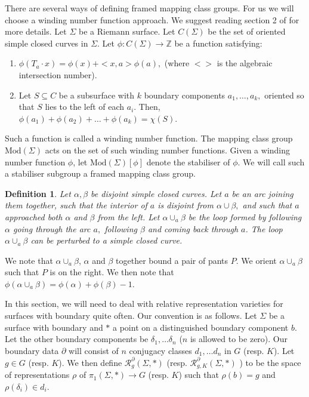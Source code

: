 \documentclass{article}
\newcommand{\Rc}{\mathcal{R}}
\newcommand{\ZZ}{ \mathbb{Z}}
\newcommand{\Mod}{\textrm{Mod}}
\newtheorem{definition}[theorem]{Definition}
\begin{document}
There are several ways of defining framed mapping class groups. For us we will choose a winding number function approach. We suggest reading \cite{CS} section 2 of \cite{CS} for more details.
Let $\Sigma$ be a Riemann surface. Let $C(\Sigma)$ be the set of oriented simple closed curves in $\Sigma$.
Let $\phi: C(\Sigma) \to \ZZ$ be a function satisfying:
\begin{enumerate}
    \item $\phi(T_a \cdot x) = \phi(x) + <x,a>\phi(a),$ (where $<>$ is the algebraic intersection number).
    \item Let $S \subseteq C$ be a subsurface with $k$ boundary components $a_1, \dots, a_k,$ oriented so that $S$ lies to the left of each $a_i$. Then, $\phi(a_1) + \phi(a_2) + \dots + \phi(a_k) = \chi(S).$
\end{enumerate}

Such a function is called a winding number function. The mapping class group $\Mod(\Sigma)$ acts on the set of such  winding number functions. Given a winding number function $\phi$, let $\Mod(\Sigma)[\phi]$ denote the stabiliser of $\phi$. We will call such a stabiliser subgroup a framed mapping class group.


\begin{definition}
     Let $\alpha, \beta$ be disjoint simple closed curves. Let $a$ be an arc joining them together, such that the interior of $a$ is disjoint from $\alpha \cup \beta,$ and such that $a$ approached both $\alpha$ and $\beta$ from the left. Let  $\alpha \cup_a \beta $ be the loop formed by following $\alpha$ going through the arc $a,$ following $\beta$ and coming back through $a$. The loop $\alpha \cup_a \beta $  can be perturbed to a simple closed curve.
\end{definition}

We note that $\alpha \cup_a \beta $, $\alpha$ and $\beta$ together bound a pair of pants $P$. We orient  $\alpha \cup_a \beta $ such that $P$ is on the right. We then note that $\phi (\alpha\cup_a \beta) = \phi(\alpha) + \phi(\beta) -1.$

In this section, we will need to deal with relative representation varieties for surfaces with boundary quite often. Our convention is as follows. Let $\Sigma$ be a surface with boundary and $*$ a point on a distinguished boundary component $b$. Let the other boundary components be $\delta_1, \dots \delta_n$ ($n$ is allowed to be zero). Our boundary data $\partial$ will consist of $n$ conjugacy classes $d_1, \dots d_n$ in $G$ (resp. $K$). Let  $g \in G$ (resp. $K$). We then define $\Rc^\partial_g(\Sigma, *)$ (resp. $\Rc_{g,K}^\partial(\Sigma, *)$ ) to be the space of representations $\rho$ of $\pi_1(\Sigma, *) \to G$ (resp. $K$) such that $\rho(b) =g$ and $\rho(\delta_i) \in d_i$.
\end{document}
